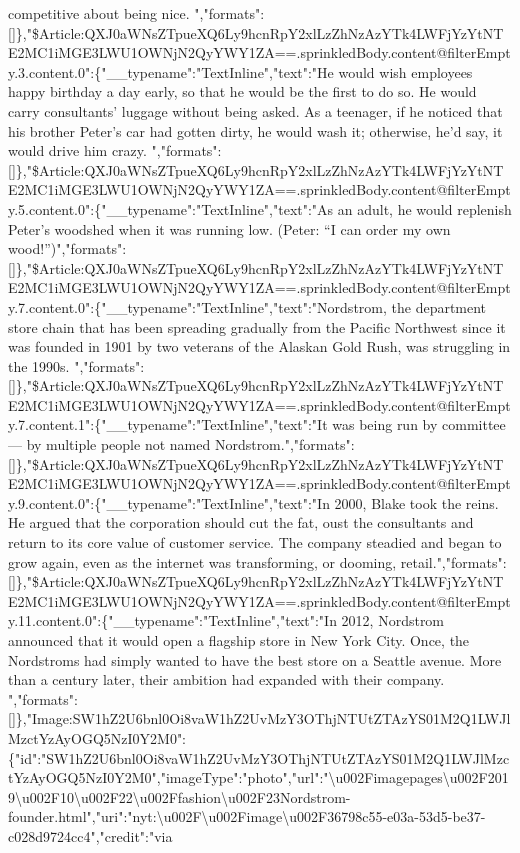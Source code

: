competitive about being nice.
","formats":{[}{]}\},"\$Article:QXJ0aWNsZTpueXQ6Ly9hcnRpY2xlLzZhNzAzYTk4LWFjYzYtNTE2MC1iMGE3LWU1OWNjN2QyYWY1ZA==.sprinkledBody.content@filterEmpty.3.content.0":\{"\_\_typename":"TextInline","text":"He
would wish employees happy birthday a day early, so that he would be the
first to do so. He would carry consultants' luggage without being asked.
As a teenager, if he noticed that his brother Peter's car had gotten
dirty, he would wash it; otherwise, he'd say, it would drive him crazy.
","formats":{[}{]}\},"\$Article:QXJ0aWNsZTpueXQ6Ly9hcnRpY2xlLzZhNzAzYTk4LWFjYzYtNTE2MC1iMGE3LWU1OWNjN2QyYWY1ZA==.sprinkledBody.content@filterEmpty.5.content.0":\{"\_\_typename":"TextInline","text":"As
an adult, he would replenish Peter's woodshed when it was running low.
(Peter: ``I can order my own
wood!'')","formats":{[}{]}\},"\$Article:QXJ0aWNsZTpueXQ6Ly9hcnRpY2xlLzZhNzAzYTk4LWFjYzYtNTE2MC1iMGE3LWU1OWNjN2QyYWY1ZA==.sprinkledBody.content@filterEmpty.7.content.0":\{"\_\_typename":"TextInline","text":"Nordstrom,
the department store chain that has been spreading gradually from the
Pacific Northwest since it was founded in 1901 by two veterans of the
Alaskan Gold Rush, was struggling in the 1990s.
","formats":{[}{]}\},"\$Article:QXJ0aWNsZTpueXQ6Ly9hcnRpY2xlLzZhNzAzYTk4LWFjYzYtNTE2MC1iMGE3LWU1OWNjN2QyYWY1ZA==.sprinkledBody.content@filterEmpty.7.content.1":\{"\_\_typename":"TextInline","text":"It
was being run by committee --- by multiple people not named
Nordstrom.","formats":{[}{]}\},"\$Article:QXJ0aWNsZTpueXQ6Ly9hcnRpY2xlLzZhNzAzYTk4LWFjYzYtNTE2MC1iMGE3LWU1OWNjN2QyYWY1ZA==.sprinkledBody.content@filterEmpty.9.content.0":\{"\_\_typename":"TextInline","text":"In
2000, Blake took the reins. He argued that the corporation should cut
the fat, oust the consultants and return to its core value of customer
service. The company steadied and began to grow again, even as the
internet was transforming, or dooming,
retail.","formats":{[}{]}\},"\$Article:QXJ0aWNsZTpueXQ6Ly9hcnRpY2xlLzZhNzAzYTk4LWFjYzYtNTE2MC1iMGE3LWU1OWNjN2QyYWY1ZA==.sprinkledBody.content@filterEmpty.11.content.0":\{"\_\_typename":"TextInline","text":"In
2012, Nordstrom announced that it would open a flagship store in New
York City. Once, the Nordstroms had simply wanted to have the best store
on a Seattle avenue. More than a century later, their ambition had
expanded with their company.
","formats":{[}{]}\},"Image:SW1hZ2U6bnl0Oi8vaW1hZ2UvMzY3OThjNTUtZTAzYS01M2Q1LWJlMzctYzAyOGQ5NzI0Y2M0":\{"id":"SW1hZ2U6bnl0Oi8vaW1hZ2UvMzY3OThjNTUtZTAzYS01M2Q1LWJlMzctYzAyOGQ5NzI0Y2M0","imageType":"photo","url":"\textbackslash{}u002Fimagepages\textbackslash{}u002F2019\textbackslash{}u002F10\textbackslash{}u002F22\textbackslash{}u002Ffashion\textbackslash{}u002F23Nordstrom-founder.html","uri":"nyt:\textbackslash{}u002F\textbackslash{}u002Fimage\textbackslash{}u002F36798c55-e03a-53d5-be37-c028d9724cc4","credit":"via
